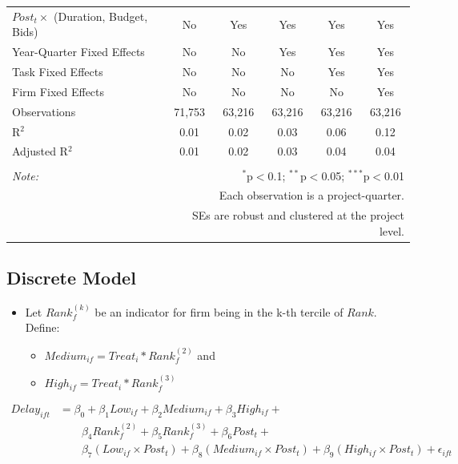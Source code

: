 \documentclass[
]{article}
\providecommand{\tightlist}{%
  \setlength{\itemsep}{0pt}\setlength{\parskip}{0pt}}
\begin{document}
\begin{table}[H]
\begin{tabular}{@{\extracolsep{-2pt}}lccccc}
$Post_t \times$  (Duration, Budget, Bids) & No & Yes & Yes & Yes & Yes \\ 
Year-Quarter Fixed Effects & No & No & Yes & Yes & Yes \\ 
Task Fixed Effects & No & No & No & Yes & Yes \\ 
Firm Fixed Effects & No & No & No & No & Yes \\ 
Observations & 71,753 & 63,216 & 63,216 & 63,216 & 63,216 \\ 
R$^{2}$ & 0.01 & 0.02 & 0.03 & 0.06 & 0.12 \\ 
Adjusted R$^{2}$ & 0.01 & 0.02 & 0.03 & 0.04 & 0.04 \\ 
\hline 
\hline \\[-1.8ex] 
\textit{Note:}  & \multicolumn{5}{r}{$^{*}$p$<$0.1; $^{**}$p$<$0.05; $^{***}$p$<$0.01} \\ 
 & \multicolumn{5}{r}{Each observation is a project-quarter.} \\ 
 & \multicolumn{5}{r}{SEs are robust and clustered at the project level.} \\ 
\end{tabular} 
\end{table}

\hypertarget{discrete-model}{%
\subsection{Discrete Model}\label{discrete-model}}

\begin{itemize}
\tightlist
\item
  Let \(Rank_f^{(k)}\) be an indicator for firm being in the k-th
  tercile of \(Rank\). Define:

  \begin{itemize}
  \tightlist
  \item
    \(Medium_{if}=Treat_i*Rank_f^{(2)}\) and
  \item
    \(High_{if} = Treat_i*Rank_f^{(3)}\)
  \end{itemize}
\end{itemize}

\[\begin{aligned} Delay_{ift} &= \beta_0+\beta_1 Low_{if}+\beta_2 Medium_{if}+\beta_3 High_{if} +\\  & \qquad  \beta_4 Rank_f^{(2)} + \beta_5 Rank_f^{(3)}+ \beta_6 Post_t + \\& \qquad \beta_7 (Low_{if} \times Post_t) + \beta_8 (Medium_{if} \times Post_t) + \beta_9 (High_{if} \times Post_t) + \epsilon_{ift} \end{aligned}\]
\end{document}
